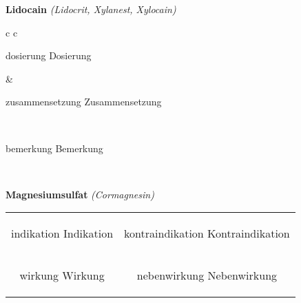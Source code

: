 \documentclass[12pt]{beamer}
\begin{document}
\begin{frame}{
    \textbf{Lidocain}
    \textit{(Lidocrit, Xylanest, Xylocain)}
}
    \begin{tabular}{c c}
        \begin{beamercolorbox}[wd=\boxwidth\textwidth,ht=\boxheight\textheight,sep=1em]{dosierung}
        Dosierung
        \end{beamercolorbox} & 
        \begin{beamercolorbox}[wd=\boxwidth\textwidth,ht=\boxheight\textheight,sep=1em]{zusammensetzung}
        Zusammensetzung
        \end{beamercolorbox} \\
        \begin{beamercolorbox}[wd=\textwidth,ht=\boxheight\textheight,sep=1em]{bemerkung}
        Bemerkung
        \end{beamercolorbox} \\
    \end{tabular}
\end{frame}

\begin{frame}{
    \textbf{Magnesiumsulfat}
    \textit{(Cormagnesin)}
}
    \begin{tabular}{c c}
        \begin{beamercolorbox}[wd=\boxwidth\textwidth,ht=\boxheight\textheight,sep=1em]{indikation}
        Indikation
        \end{beamercolorbox} & 
        \begin{beamercolorbox}[wd=\boxwidth\textwidth,ht=\boxheight\textheight,sep=1em]{kontraindikation}
        Kontraindikation 
        \end{beamercolorbox} \\
        \begin{beamercolorbox}[wd=\boxwidth\textwidth,ht=\boxheight\textheight,sep=1em]{wirkung}
        Wirkung
        \end{beamercolorbox} & 
        \begin{beamercolorbox}[wd=\boxwidth\textwidth,ht=\boxheight\textheight,sep=1em]{nebenwirkung}
        Nebenwirkung
        \end{beamercolorbox} \\
    \end{tabular}
\end{frame}
\end{document}
